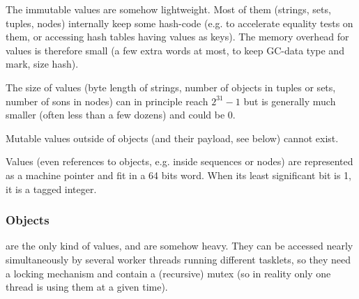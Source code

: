 The immutable values are somehow lightweight. Most of them (strings,
sets, tuples, nodes) internally keep some hash-code (e.g. to
accelerate equality tests on them, or accessing hash tables having
values as keys). The memory overhead for values is therefore small (a
few extra words at most, to keep GC-data type and mark, size hash).

The size of values (byte length of strings, number of objects in
tuples or sets, number of sons in nodes) can in principle reach
$2^{31} - 1$ but is generally much smaller (often less than a few
dozens) and could be 0.

Mutable values outside of objects (and their payload, see below)
cannot exist.

Values (even references to objects, e.g. inside sequences or nodes)
are represented as a machine pointer and fit in a 64 bits word. When
its least significant bit is 1, it is a tagged integer.

\subsubsection{Objects}

 are the only kind of 
values, and are somehow heavy. They can be accessed nearly
simultaneously by several worker threads running different tasklets,
so they need a locking mechanism and contain a (recursive) mutex (so
in reality only one thread is using them at a given time).
